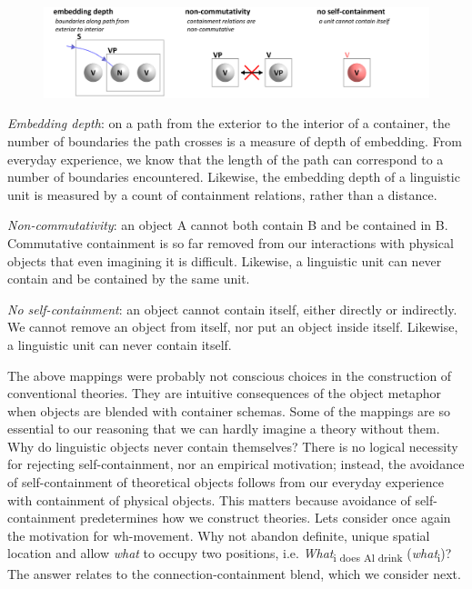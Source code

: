   
\begin{figure}
\includegraphics[width=\textwidth]{figures/Tilsen-img33.png}
\caption{\missingcaption}
\label{fig:}
\end{figure}
 

\textit{Embedding depth}: on a path from the exterior to the interior of a container, the number of boundaries the path crosses is a measure of depth of embedding. From everyday experience, we know that the length of the path can correspond to a number of boundaries encountered. Likewise, the embedding depth of a linguistic unit is measured by a count of containment relations, rather than a distance.

\textit{Non-commutativity}: an object A cannot both contain B and be contained in B. Commutative containment is so far removed from our interactions with physical objects that even imagining it is difficult. Likewise, a linguistic unit can never contain and be contained by the same unit.

\textit{No self-containment}: an object cannot contain itself, either directly or indirectly. We cannot remove an object from itself, nor put an object inside itself. Likewise, a linguistic unit can never contain itself. 

  The above mappings were probably not conscious choices in the construction of conventional theories. They are intuitive consequences of the object metaphor when objects are blended with container schemas. Some of the mappings are so essential to our reasoning that we can hardly imagine a theory without them. Why do linguistic objects never contain themselves? There is no logical necessity for rejecting self-containment, nor an empirical motivation; instead, the avoidance of self-containment of theoretical objects follows from our everyday experience with containment of physical objects. This matters because avoidance of self-containment predetermines how we construct theories. Lets consider once again the motivation for wh-movement. Why not abandon definite, unique spatial location and allow \textit{what} to occupy two positions, i.e. \textit{What}\textsubscript{i does Al drink} (\textit{what}\textsubscript{i})? The answer relates to the connection-containment blend, which we consider next.

